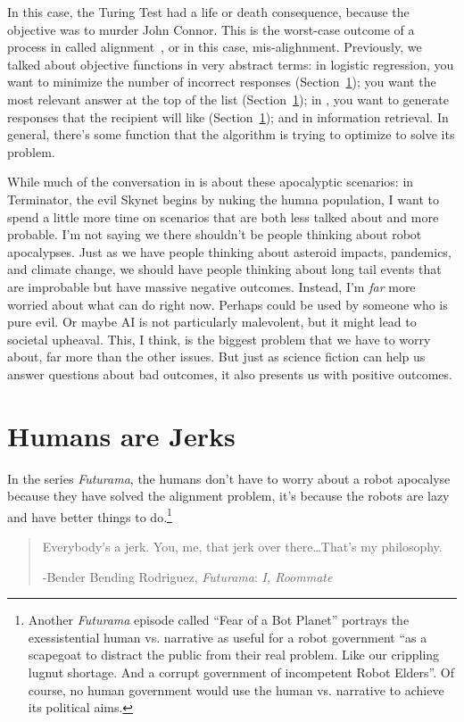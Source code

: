 In this case, the Turing Test had a life or death consequence, because
the  objective was to murder John Connor.
%
This is the worst-case outcome of a process in  called
alignment~\cite{}, or in this case, mis-alighnment.
%
Previously, we talked about objective functions in very abstract
terms: in logistic regression, you want to minimize the number of
incorrect responses (Section~\ref{}); you want the most relevant
answer at the top of the list (Section~\ref{}); in , you
want to generate responses that the recipient will like
(Section~\ref{}); and in information retrieval.
%
In general, there's some function that the algorithm is trying to
optimize to solve its problem.

While much of the conversation in \currentyear{} is about these
apocalyptic scenarios: in Terminator, the evil  Skynet begins
by nuking the humna population, I want to spend a little more time on
scenarios that are both less talked about and more probable.
%
I'm not saying we there shouldn't be people thinking about robot apocalypses.
%
Just as we have people thinking about asteroid impacts, pandemics, and
climate change, we should have people thinking about long tail events
that are improbable but have massive negative outcomes.
%
Instead, I'm \emph{far} more worried about what  can do right now.
%
Perhaps  could be used by someone who is
pure evil. Or maybe AI is not
particularly malevolent, but it might lead to societal upheaval. This, I think, is the biggest
problem that we have to worry about, far more than the other issues.
%
But just as science fiction can help us answer questions about bad
outcomes, it also presents us with positive outcomes.

\section{Humans are Jerks}

In the series \textit{Futurama}, the humans don't have to worry about
a robot apocalyse because they have solved the alignment problem, it's
because the robots are lazy and have better things to
do.\footnote{Another \textit{Futurama} episode called ``Fear of a Bot
  Planet'' portrays the exessistential human vs.  narrative as
  useful for a robot government ``as a scapegoat to distract the
  public from their real problem.  Like our crippling lugnut
  shortage. And a corrupt government of incompetent Robot Elders''.
  Of course, no human government would use the human vs. 
  narrative to achieve its political aims.}
\begin{quote}
  Everybody's a jerk.  You, me, that jerk over there\dots That's
  my philosophy.
  
  -Bender Bending Rodriguez, \textit{Futurama}: \textit{I, Roommate}
\end{quote}

